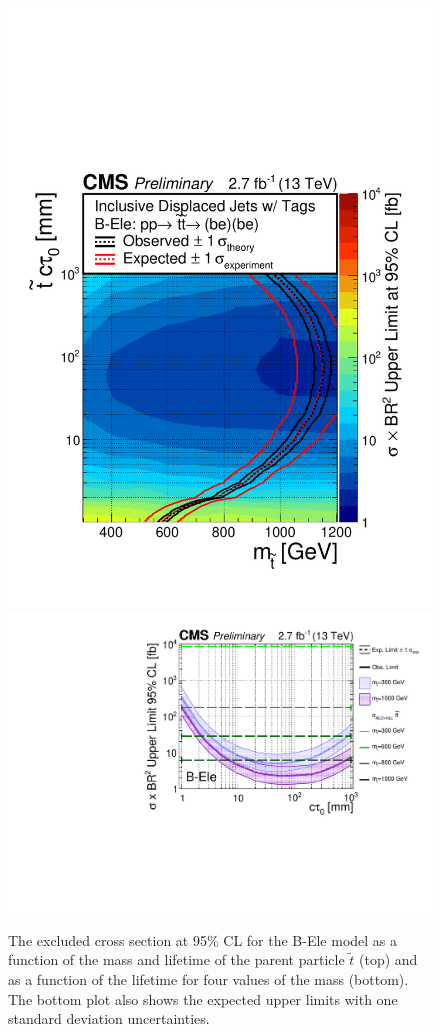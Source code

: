 \begin{figure}[tb]
\begin{center}
\includegraphics[width=.75\textwidth]{figures/pas//RESULT/UNBLINDED_LIMITS/B-Ele2D.pdf}
\includegraphics[width=.75\textwidth]{figures/pas//RESULT/UNBLINDED_LIMITS/B-Ele.pdf}
\caption{ The excluded cross section at 95\% CL for the B-Ele model as
  a function of the mass and lifetime of the parent particle
  $\tilde{t}$ (top) and as a function of the lifetime for four values
  of the mass (bottom).  The bottom plot also shows the expected upper
  limits with one standard deviation
  uncertainties.\label{fig:dsusy_limit_ele}}
\end{center}
\end{figure}

